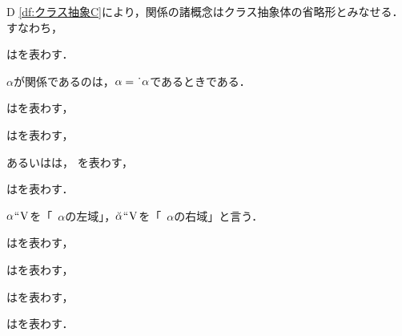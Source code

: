 D \ref{df:クラス抽象C}により，関係の諸概念はクラス抽象体の省略形とみなせる．すなわち，

\begin{df}[関係部分]
\label{df:関係部分}
\kagi{$
    \dotl{\alpha}
$}はを表わす．
\end{df}
\noindent$\alpha$が関係であるのは，$\alpha=\dot{\:\:}\alpha $であるときである．

\begin{df}[同一性関係]
\label{df:同一性関係}
はを表わす，
\end{df}

\begin{df}[要素関係]
\label{df:要素関係}
はを表わす，
\end{df}

\begin{df}[関係の逆]
\label{df:関係の逆}
\kagi{$\breve{\alpha}$}あるいは\kagi{$\brevel{\alpha}$}は，
を表わす，
\end{df}

\begin{df}[関係の像]
\label{df:関係の像}
\kagi{$
    \alpha\img\beta
$}はを表わす．
\end{df}
\noindent $ \alpha{\mspace{1mu}{``}\mspace{1mu}}\mathrm{V} $を「~$\alpha$の左域」，$ \breve{\alpha}{\mspace{1mu}{``}\mspace{1mu}}\mathrm{V} $を「~$\alpha$の右域」と言う．

\begin{df}[関係の積]
\label{df:関係の積}
\kagi{$
\alpha\resl\beta
$}はを表わす，
\end{df}

\begin{df}[直積]
\label{df:直積}
\kagi{$
    \alpha\times\beta
$}はを表わす，
\end{df}

\begin{df}[右域の制限]
\label{df:右域の制限}
\kagi{$
    \alpha\uphr\beta
$}は\kagi{$
    \alpha\cup(\univ\times\beta)
$}を表わす，
\end{df}

\begin{df}[左域の制限]
\label{df:左域の制限}
\kagi{$
    \beta\uphl\alpha
$}は\kagi{$
    \alpha\cup(\beta\times\univ)
$}を表わす．
\end{df}

